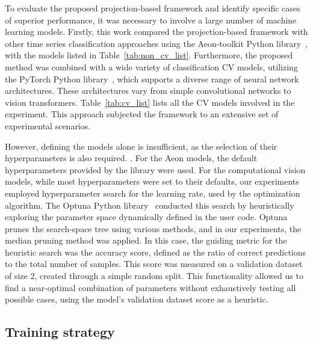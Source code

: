 To evaluate the proposed projection-based framework and identify specific cases of superior performance, it was necessary to involve a large number of machine learning models. Firstly, this work compared the projection-based framework with other time series classification approaches using the Aeon-toolkit Python library~\cite{AeonDoc}, with the models listed in Table~\ref{tab:non_cv_list}. Furthermore, the proposed method was combined with a wide variety of classification \gls{CV} models, utilizing the PyTorch Python library~\cite{PytorchDoc}, which supports a diverse range of neural network architectures. These architectures vary from simple convolutional networks to vision transformers. Table~\ref{tab:cv_list} lists all the \gls{CV} models involved in the experiment. This approach subjected the framework to an extensive set of experimental scenarios.






However, defining the models alone is insufficient, as the selection of their hyperparameters is also required. . For the Aeon models, the default hyperparameters provided by the library were used. For the computational vision models, while most hyperparameters were set to their defaults, our experiments employed hyperparameter search for the learning rate, used by the optimization algorithm. The Optuna Python library~\cite{OptunaDoc} conducted this search by heuristically exploring the parameter space dynamically defined in the user code. Optuna prunes the search-space tree using various methods, and in our experiments, the median pruning method was applied. In this case, the guiding metric for the heuristic search was the accuracy score, defined as the ratio of correct predictions to the total number of samples. This score was measured on a validation dataset of size 2, created through a simple random split. This functionality allowed us to find a near-optimal combination of parameters without exhaustively testing all possible cases, using the model's validation dataset score as a heuristic.

\subsection{Training strategy}

